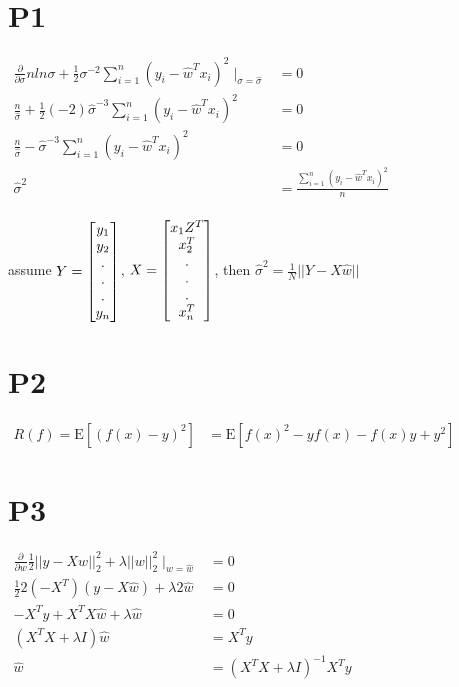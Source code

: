 \documentclass{article}
\begin{document}
\newcommand{\under}[2]{\mathop{#1}\limits_{#2}}
\newcommand{\s}{\sum\limits_{i=1}^{n}}
\newcommand{\p}[2]{\frac{\partial #1}{\partial #2}}
\newcommand{\B}[1]{\left\{\begin{aligned}#1\end{aligned}\right.}
\newcommand{\E}{\mathrm{E}}
\newcommand{\V}{\mathrm{V}}

\section{P1}

$
\begin{aligned}
  \p{}{\sigma} nln\sigma + \frac{1}{2} \sigma^{-2} \s (y_i-\hat{w}^Tx_i)^2 \mid _{\sigma=\hat{\sigma}} &= 0 \\
  \frac{n}{\hat{\sigma}} + \frac{1}{2} (-2) \hat{\sigma}^{-3} \s (y_i-\hat{w}^Tx_i)^2                  &= 0 \\
  \frac{n}{\hat{\sigma}} - \hat{\sigma}^{-3} \s (y_i-\hat{w}^Tx_i)^2                                   &= 0 \\
  \hat{\sigma}^{2}                                                                                     &= \frac{\s (y_i-\hat{w}^Tx_i)^2}{n} \\
\end{aligned}
$

assume $Y = \begin{bmatrix}y_1 \\ y_2 \\ . \\ . \\ . \\ y_n\end{bmatrix}$,
$X = \begin{bmatrix}x_1Z^T \\ x_2^T \\ . \\ . \\ . \\ x_n^T\end{bmatrix}$, then $\hat{\sigma}^2 = \frac{1}{N}||Y-X\hat{w}||$

\section{P2}

$
\begin{aligned}
  R(f) = \E[(f(x)-y)^2] & = \E[f(x)^2-yf(x)-f(x)y+y^2]
\end{aligned}
$

\section{P3}

$
\begin{aligned}
  \p{}{w} \frac{1}{2} ||y-Xw||^2_2 + \lambda ||w||^2_2 \mid _{w=\hat{w}} &= 0 \\
  \frac{1}{2} 2 (-X^T) (y-X\hat{w}) + \lambda 2 \hat{w}                  &= 0 \\
  -X^Ty + X^TX\hat{w} + \lambda \hat{w} &= 0 \\
  (X^TX + \lambda I)\hat{w} &= X^Ty \\
  \hat{w} &= (X^TX + \lambda I)^{-1}X^Ty \\
\end{aligned}
$
\end{document}
